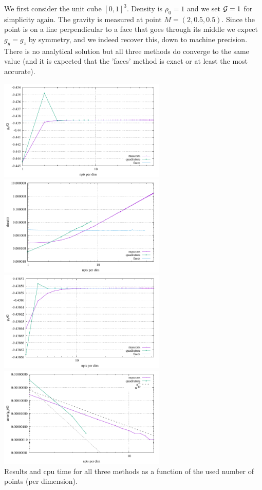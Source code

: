 We first consider the unit cube $[0,1]^3$. Density is $\rho_0=1$ and 
we set ${\cal G}=1$ for simplicity again.
The gravity is measured at point $M=(2,0.5,0.5)$. Since the point is on a line perpendicular 
to a face that goes through its middle we expect $g_y=g_z$ by symmetry, and 
we indeed recover this, down to machine precision.
There is no analytical solution but all three methods do converge to the same value
(and it is expected that the 'faces' method is exact or at least the most accurate).

\begin{center}
\includegraphics[width=8cm]{python_codes/fieldstone_113/results/hex_test1/gx.pdf}
\includegraphics[width=8cm]{python_codes/fieldstone_113/results/hex_test1/time.pdf}\\
\includegraphics[width=8cm]{python_codes/fieldstone_113/results/hex_test1/gx2.pdf}
\includegraphics[width=8cm]{python_codes/fieldstone_113/results/hex_test1/gx3.pdf}\\
{\captionfont Results and cpu time for all three methods as a function of 
the used number of points (per dimension).}
\end{center}

